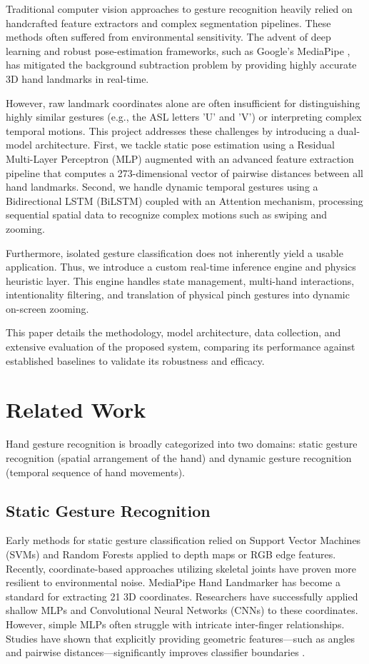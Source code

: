 \documentclass[10pt,twocolumn,letterpaper]{article}
\begin{document}
Traditional computer vision approaches to gesture recognition heavily relied on handcrafted feature extractors and complex segmentation pipelines. These methods often suffered from environmental sensitivity. The advent of deep learning and robust pose-estimation frameworks, such as Google's MediaPipe \cite{Lugaresi2019}, has mitigated the background subtraction problem by providing highly accurate 3D hand landmarks in real-time. 

However, raw landmark coordinates alone are often insufficient for distinguishing highly similar gestures (e.g., the ASL letters 'U' and 'V') or interpreting complex temporal motions. This project addresses these challenges by introducing a dual-model architecture. First, we tackle static pose estimation using a Residual Multi-Layer Perceptron (MLP) augmented with an advanced feature extraction pipeline that computes a 273-dimensional vector of pairwise distances between all hand landmarks. Second, we handle dynamic temporal gestures using a Bidirectional LSTM (BiLSTM) coupled with an Attention mechanism, processing sequential spatial data to recognize complex motions such as swiping and zooming.

Furthermore, isolated gesture classification does not inherently yield a usable application. Thus, we introduce a custom real-time inference engine and physics heuristic layer. This engine handles state management, multi-hand interactions, intentionality filtering, and translation of physical pinch gestures into dynamic on-screen zooming.

This paper details the methodology, model architecture, data collection, and extensive evaluation of the proposed system, comparing its performance against established baselines to validate its robustness and efficacy.

\section{Related Work}

Hand gesture recognition is broadly categorized into two domains: static gesture recognition (spatial arrangement of the hand) and dynamic gesture recognition (temporal sequence of hand movements).

\subsection{Static Gesture Recognition}
Early methods for static gesture classification relied on Support Vector Machines (SVMs) and Random Forests applied to depth maps or RGB edge features. Recently, coordinate-based approaches utilizing skeletal joints have proven more resilient to environmental noise. MediaPipe Hand Landmarker \cite{Lugaresi2019} has become a standard for extracting 21 3D coordinates. Researchers have successfully applied shallow MLPs and Convolutional Neural Networks (CNNs) to these coordinates. However, simple MLPs often struggle with intricate inter-finger relationships. Studies have shown that explicitly providing geometric features—such as angles and pairwise distances—significantly improves classifier boundaries \cite{Zhang2021}. 
\end{document}
